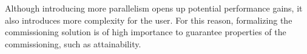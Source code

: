 Although introducing more parallelism opens up potential performance
gains, it also introduces more complexity for the user. For this
reason, formalizing the commissioning solution is of high importance
to guarantee properties of the commissioning, such as attainability.




